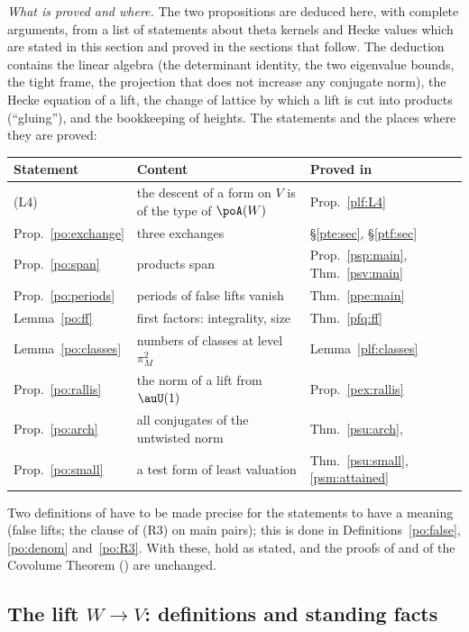 \documentclass[10pt]{amsart}
\theoremstyle{definition}
\theoremstyle{remark}
\begin{document}
\emph{What is proved and where.} The two propositions are deduced here, with complete
arguments, from a list of statements about theta kernels and Hecke values which are stated in this
section and proved in the sections that follow. The deduction contains the linear algebra
(the determinant identity, the two eigenvalue bounds, the tight frame, the projection that does not
increase any conjugate norm), the Hecke equation of a lift, the change of lattice by which a lift
is cut into products (``gluing''), and the bookkeeping of heights. The statements and the places
where they are proved:
\begin{center}
\begin{tabular}{lll}
\hline
Statement&Content&Proved in\\
\hline
(L4)&the descent of a form on $V$ is of the type of $\poA(W)$&Prop.~\ref{plf:L4}\\
Prop.~\ref{po:exchange}&three exchanges&\S\ref{pte:sec}, \S\ref{ptf:sec}\\
Prop.~\ref{po:span}&products span&Prop.~\ref{psp:main}, Thm.~\ref{psv:main}\\
Prop.~\ref{po:periods}&periods of false lifts vanish&Thm.~\ref{ppe:main}\\
Lemma~\ref{po:ff}&first factors: integrality, size&Thm.~\ref{pfq:ff}\\
Lemma~\ref{po:classes}&numbers of classes at level $\pi_M^2$&Lemma~\ref{plf:classes}\\
Prop.~\ref{po:rallis}&the norm of a lift from $\auU(1)$&Prop.~\ref{pex:rallis}\\
Prop.~\ref{po:arch}&all conjugates of the untwisted norm&Thm.~\ref{psu:arch}, {\cite[Thm.~9.1]{P53}}\\
Prop.~\ref{po:small}&a test form of least valuation&Thm.~\ref{psu:small}, \ref{psm:attained}\\
\hline
\end{tabular}
\end{center}
Two definitions of {\cite[\S14.10]{P46}} have to be made precise for the statements to have a
meaning (false lifts; the clause of (R3) on main pairs); this is done in
Definitions~\ref{po:false}, \ref{po:denom} and~\ref{po:R3}. With these, {\cite[Propositions~14.41 and~14.42]{P46}} hold as stated, and the
proofs of {\cite[Proposition~14.43]{P46}} and of the Covolume Theorem ({\cite[Theorem~14.15]{P46}}) are unchanged.

\subsection{The lift $W\to V$: definitions and standing facts}\label{po:ss-set}
\end{document}
